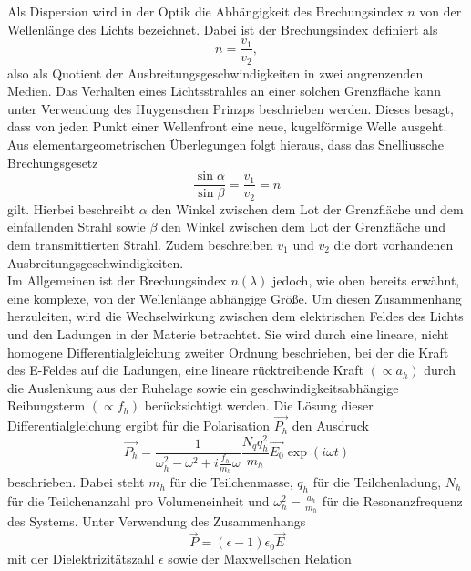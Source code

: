 Als Dispersion wird in der Optik die Abhängigkeit des Brechungsindex $n$ von der Wellenlänge des Lichts bezeichnet.
Dabei ist der Brechungsindex definiert als
\begin{equation}
  n = \frac{v_1}{v_2},
\end{equation}
also als Quotient der Ausbreitungsgeschwindigkeiten in zwei angrenzenden Medien.
Das Verhalten eines Lichtsstrahles an einer solchen Grenzfläche kann unter Verwendung des Huygenschen Prinzps beschrieben werden.
Dieses besagt, dass von jeden Punkt einer Wellenfront eine neue, kugelförmige Welle ausgeht.
Aus elementargeometrischen Überlegungen folgt hieraus, dass das Snelliussche Brechungsgesetz
\begin{equation}
  \frac{\sin{\alpha}}{\sin{\beta}} = \frac{v_1}{v_2} = n
  \label{eqn:snel}
\end{equation}
gilt.
Hierbei beschreibt $\alpha$ den Winkel zwischen dem Lot der Grenzfläche und dem einfallenden Strahl sowie $\beta$ den Winkel zwischen dem Lot der Grenzfläche und dem transmittierten Strahl.
Zudem beschreiben $v_1$ und $v_2$ die dort vorhandenen Ausbreitungsgeschwindigkeiten.\\
Im Allgemeinen ist der Brechungsindex $n(\lambda)$ jedoch, wie oben bereits erwähnt, eine komplexe, von der Wellenlänge abhängige Größe.
Um diesen Zusammenhang herzuleiten, wird die Wechselwirkung zwischen dem elektrischen Feldes des Lichts und den Ladungen in der Materie betrachtet.
Sie wird durch eine lineare, nicht homogene Differentialgleichung zweiter Ordnung beschrieben, bei der die Kraft des E-Feldes auf die Ladungen, eine lineare rücktreibende Kraft $( \propto a_h )$ durch die Auslenkung aus der Ruhelage sowie ein geschwindigkeitsabhängige Reibungsterm $(\propto f_h)$ berücksichtigt werden.
Die Lösung dieser Differentialgleichung ergibt für die Polarisation $\vec{P_h}$ den Ausdruck
\begin{equation}
  \vec{P_h} = \frac{1}{\omega_h^2 - \omega^2 + i \frac{f_h}{m_h}\omega} \frac{N_q q_h^2}{m_h} \vec{E_0} \exp{( i \omega t )}
\end{equation}
beschrieben.
Dabei steht $m_h$ für die Teilchenmasse, $q_h$ für die Teilchenladung, $N_h$ für die Teilchenanzahl pro Volumeneinheit und $\omega_h^2 = \frac{a_h}{m_h}$ für die Resonanzfrequenz des Systems.
Unter Verwendung des Zusammenhangs
\begin{equation}
  \vec{P} = (\epsilon - 1) \epsilon_0 \vec{E}
\end{equation}
mit der Dielektrizitätszahl $\epsilon$ sowie der Maxwellschen Relation
